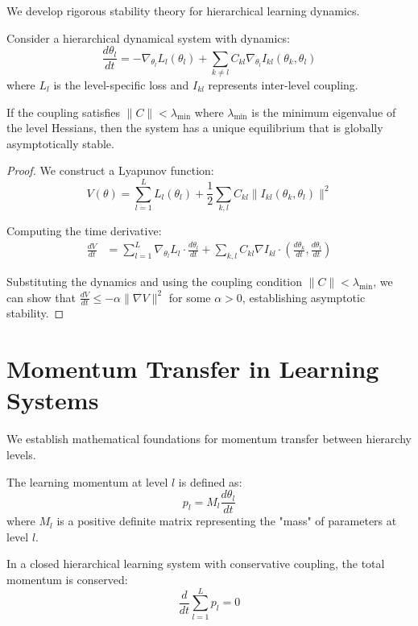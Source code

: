 We develop rigorous stability theory for hierarchical learning dynamics.

\begin{theorem}
\label{thm:hierarchical_stability}
Consider a hierarchical dynamical system with dynamics:
$$\frac{d\theta_l}{dt} = -\nabla_{\theta_l} L_l(\theta_l) + \sum_{k \neq l} C_{kl} \nabla_{\theta_l} I_{kl}(\theta_k, \theta_l)$$
where $L_l$ is the level-specific loss and $I_{kl}$ represents inter-level coupling.

If the coupling satisfies $\|C\| < \lambda_{\min}$ where $\lambda_{\min}$ is the minimum eigenvalue of the level Hessians, then the system has a unique equilibrium that is globally asymptotically stable.
\end{theorem}

\begin{proof}
We construct a Lyapunov function:
$$V(\theta) = \sum_{l=1}^L L_l(\theta_l) + \frac{1}{2}\sum_{k,l} C_{kl} \|I_{kl}(\theta_k, \theta_l)\|^2$$

Computing the time derivative:
\begin{align}
\frac{dV}{dt} &= \sum_{l=1}^L \nabla_{\theta_l} L_l \cdot \frac{d\theta_l}{dt} + \sum_{k,l} C_{kl} \nabla I_{kl} \cdot \left(\frac{d\theta_k}{dt}, \frac{d\theta_l}{dt}\right)
\end{align}

Substituting the dynamics and using the coupling condition $\|C\| < \lambda_{\min}$, we can show that $\frac{dV}{dt} \leq -\alpha \|\nabla V\|^2$ for some $\alpha > 0$, establishing asymptotic stability.
\end{proof}

\section{Momentum Transfer in Learning Systems}

We establish mathematical foundations for momentum transfer between hierarchy levels.

\begin{definition}
\label{def:learning_momentum}
The learning momentum at level $l$ is defined as:
$$p_l = M_l \frac{d\theta_l}{dt}$$
where $M_l$ is a positive definite matrix representing the "mass" of parameters at level $l$.
\end{definition}

\begin{theorem}
\label{thm:momentum_conservation}
In a closed hierarchical learning system with conservative coupling, the total momentum is conserved:
$$\frac{d}{dt}\sum_{l=1}^L p_l = 0$$
\end{theorem}

